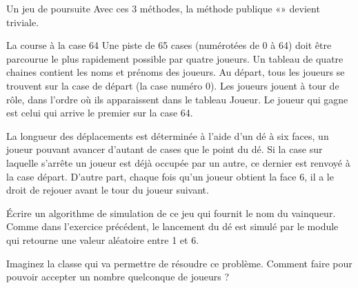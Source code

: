 \begin{Exercice}{Un jeu de poursuite}
	Avec ces 3 méthodes, la méthode publique
	«» devient triviale.
\end{Exercice}

\begin{Exercice}{La course à la case 64}
	Une piste de 65 cases (numérotées de 0 à 64)
	doit être parcourue le plus rapidement possible par quatre joueurs. Un
	tableau  de quatre chaines contient les noms et prénoms des
	joueurs. Au départ, tous les joueurs se trouvent sur la case de départ
	(la case numéro 0). Les joueurs jouent à tour de rôle, dans l’ordre où
	ils apparaissent dans le tableau Joueur. Le joueur qui gagne est celui
	qui arrive le premier sur la case 64.

	La longueur des déplacements est déterminée à
	l’aide d’un dé à six faces, un joueur pouvant avancer d’autant de cases
	que le point du dé. Si la case sur laquelle s’arrête un joueur est déjà
	occupée par un autre, ce dernier est renvoyé à la case départ. D’autre
	part, chaque fois qu’un joueur obtient la face 6, il a le droit de
	rejouer avant le tour du joueur suivant. 

	Écrire un algorithme de simulation de ce jeu
	qui fournit le nom du vainqueur. Comme dans l’exercice précédent, le
	lancement du dé est simulé par le module  qui retourne une valeur aléatoire entre 1 et 6.

	Imaginez la classe  qui va permettre
	de résoudre ce problème. Comment faire pour pouvoir accepter un nombre
	quelconque de joueurs ?
\end{Exercice}

